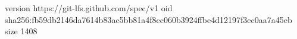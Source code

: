 version https://git-lfs.github.com/spec/v1
oid sha256:fb59db2146da7614b83ac5bb81a4f8cc060b3924ffbe4d12197f3ec0aa7a45eb
size 1408
